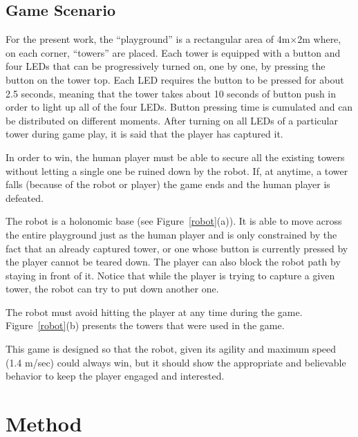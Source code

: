 \subsection{Game Scenario}
For the present work, the ``playground'' is a rectangular area of 4m$\times$2m where, on each corner, ``towers'' are placed. Each tower is equipped with a button and four LEDs that can be progressively turned on, one by one, by pressing the button on the tower top. Each LED requires the button to be pressed for about 2.5 seconds, meaning that the tower takes about 10 seconds of button push in order to light up all of the four LEDs. Button pressing time is cumulated and can be distributed on different moments. After turning on all LEDs of a particular tower during game play, it is said that the player has captured it.

In order to win, the human player must be able to secure all the existing towers without letting a single one be ruined down by the robot. If, at anytime, a tower falls (because of the robot or player) the game ends and the human player is defeated. 

The robot is a holonomic base (see Figure~\ref{robot}(a)). It is able to move across the entire playground just as the human player and is only constrained by the fact that an already captured tower, or one whose button is currently pressed by the player cannot be teared down. The player can also block the robot path by staying in front of it. Notice that while the player is trying to capture a given tower, the robot can try to put down another one.

The robot must avoid hitting the player at any time during the game. Figure~\ref{robot}(b) presents the towers that were used in the game.

This game is designed so that the robot, given its agility and maximum speed (1.4 m/sec) could always win, but it should show the appropriate and believable behavior to keep the player engaged and interested.
  
\section{Method}


